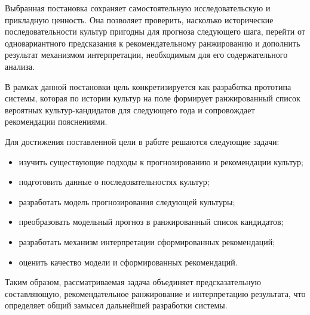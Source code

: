 Выбранная постановка сохраняет самостоятельную исследовательскую и прикладную ценность. Она позволяет проверить,
насколько исторические последовательности культур пригодны для прогноза следующего шага, перейти от одновариантного
предсказания к рекомендательному ранжированию и дополнить результат механизмом интерпретации, необходимым для его
содержательного анализа.

В рамках данной постановки цель конкретизируется как разработка прототипа системы, которая по истории культур на поле
формирует ранжированный список вероятных культур-кандидатов для следующего года и сопровождает рекомендации
пояснениями.

Для достижения поставленной цели в работе решаются следующие задачи:

\begin{itemize}
\tightlist
\item
  изучить существующие подходы к прогнозированию и рекомендации культур;
\item
  подготовить данные о последовательностях культур;
\item
  разработать модель прогнозирования следующей культуры;
\item
  преобразовать модельный прогноз в ранжированный список кандидатов;
\item
  разработать механизм интерпретации сформированных рекомендаций;
\item
  оценить качество модели и сформированных рекомендаций.
\end{itemize}

Таким образом, рассматриваемая задача объединяет предсказательную составляющую,
рекомендательное ранжирование и интерпретацию результата, что определяет общий замысел дальнейшей разработки системы.
